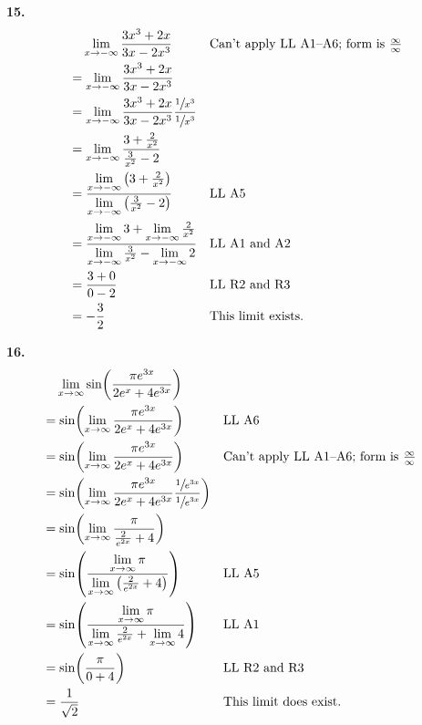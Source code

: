\documentclass[10pt,oneside,]{book}
\theoremstyle{plain}
\theoremstyle{definition}
\numberwithin{equation}{section}
\newcommand{\fe}[2]{#1\mathopen{}\left(#2\right)\mathclose{}}
\begin{document}
\par\smallskip
\noindent\textbf{15.}\quad{}\begin{align*}
&\phantom{={}}\lim\limits_{x\to-\infty}\frac{3x^3+2x}{3x-2x^3}&&\text{Can't apply LL A1--A6; form is $\tfrac{\infty}{\infty}$}\\
&=\lim\limits_{x\to-\infty}\frac{3x^3+2x}{3x-2x^3}\\
&=\lim\limits_{x\to-\infty}\frac{3x^3+2x}{3x-2x^3}\frac{\sfrac{1}{x^3}}{\sfrac{1}{x^3}}\\
&=\lim\limits_{x\to-\infty}\frac{3+\frac{2}{x^2}}{\frac{3}{x^2}-2}\\
&=\frac{\lim\limits_{x\to-\infty}\left(3+\frac{2}{x^2}\right)}{\lim\limits_{x\to-\infty}\left(\frac{3}{x^2}-2\right)}&&\text{LL A5}\\
&=\frac{\lim\limits_{x\to-\infty}3+\lim\limits_{x\to-\infty}\frac{2}{x^2}}{\lim\limits_{x\to-\infty}\frac{3}{x^2}-\lim\limits_{x\to-\infty}2}&&\text{LL A1 and A2}\\
&=\frac{3+0}{0-2}&&\text{LL R2 and R3}\\
&=-\frac{3}{2}&&\text{This limit exists.}
\end{align*}%
\par\smallskip
\noindent\textbf{16.}\quad{}\begin{align*}
&\phantom{={}}\lim\limits_{x\to\infty}\fe{\sin}{\frac{\pi e^{3x}}{2e^x+4e^{3x}}}\\
&=\fe{\sin}{\lim\limits_{x\to\infty}\frac{\pi e^{3x}}{2e^x+4e^{3x}}}&&\text{LL A6}\\
&=\fe{\sin}{\lim\limits_{x\to\infty}\frac{\pi e^{3x}}{2e^x+4e^{3x}}}&&\text{Can't apply LL A1--A6; form is $\tfrac{\infty}{\infty}$}\\
&=\fe{\sin}{\lim\limits_{x\to\infty}\frac{\pi e^{3x}}{2e^x+4e^{3x}}\frac{\sfrac{1}{e^{3x}}}{\sfrac{1}{e^{3x}}}}\\
&=\fe{\sin}{\lim\limits_{x\to\infty}\frac{\pi}{\frac{2}{e^{2x}}+4}}\\
&=\fe{\sin}{\frac{\lim\limits_{x\to\infty}\pi}{\lim\limits_{x\to\infty}\left(\frac{2}{e^{2x}}+4\right)}}&&\text{LL A5}\\
&=\fe{\sin}{\frac{\lim\limits_{x\to\infty}\pi}{\lim\limits_{x\to\infty}\frac{2}{e^{2x}}+\lim\limits_{x\to\infty}4}}&&\text{LL A1}\\
&=\fe{\sin}{\frac{\pi}{0+4}}&&\text{LL R2 and R3}\\
&=\frac{1}{\sqrt{2}}&&\text{This limit does exist.}
\end{align*}%
\par\smallskip
\end{document}
